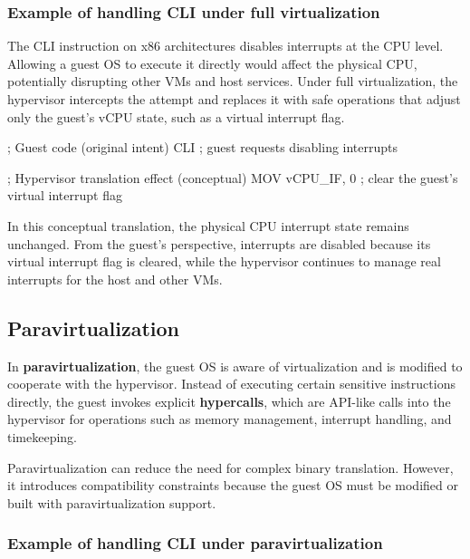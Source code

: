 \documentclass[11pt,a4paper,openany]{report}
\begin{document}
\subsubsection*{Example of handling CLI under full virtualization}

The CLI instruction on x86 architectures disables interrupts at the CPU level. Allowing a guest OS to execute it directly would affect the physical CPU, potentially disrupting other VMs and host services. Under full virtualization, the hypervisor intercepts the attempt and replaces it with safe operations that adjust only the guest's vCPU state, such as a virtual interrupt flag.

\begin{codeblock}
; Guest code (original intent)
CLI          ; guest requests disabling interrupts
\end{codeblock}

\begin{codeblock}
; Hypervisor translation effect (conceptual)
MOV vCPU_IF, 0   ; clear the guest's virtual interrupt flag
\end{codeblock}

In this conceptual translation, the physical CPU interrupt state remains unchanged. From the guest's perspective, interrupts are disabled because its virtual interrupt flag is cleared, while the hypervisor continues to manage real interrupts for the host and other VMs.

\subsection{Paravirtualization}

In \textbf{paravirtualization}, the guest OS is aware of virtualization and is modified to cooperate with the hypervisor. Instead of executing certain sensitive instructions directly, the guest invokes explicit \textbf{hypercalls}, which are API-like calls into the hypervisor for operations such as memory management, interrupt handling, and timekeeping.

Paravirtualization can reduce the need for complex binary translation. However, it introduces compatibility constraints because the guest OS must be modified or built with paravirtualization support.

\subsubsection*{Example of handling CLI under paravirtualization}
\end{document}
